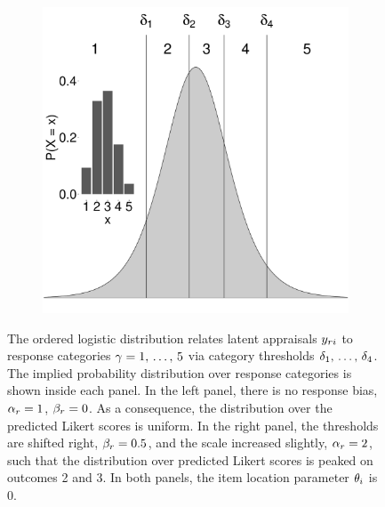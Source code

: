 \documentclass[a4paper,usenames,dvipsnames]{article}
\newenvironment{revision}{\color{black}}{\color{black}}
\begin{document}
\begin{figure}[!ht]
\begin{subfigure}{.5\textwidth}
		\includegraphics[width=.97\textwidth]{figures/orderedLogisticBiased.pdf}
	\end{subfigure}
	\caption{
		\protect\begin{revision}The ordered logistic distribution relates latent appraisals $y_{ri}$ to response categories $\gamma = 1,\,\dots,\,5$  via category thresholds $\delta_1,\,\dots,\,\delta_4$.\protect\end{revision}
		The implied probability distribution over response categories is shown inside each panel. In the left panel, there is no response bias, $\alpha_r = 1$, $\beta_r = 0$. As a consequence, the distribution over the predicted Likert scores is uniform. In the right panel, the thresholds are shifted right, $\beta_r = 0.5$, and the scale increased slightly, $\alpha_r = 2$, such that the distribution over predicted Likert scores is peaked on outcomes 2 and 3. \protect\begin{revision}In both panels, the item location parameter $\theta_i$ is 0.\protect\end{revision}}
	\label{fig:orderedLogistic}
\end{figure}
\end{document}
